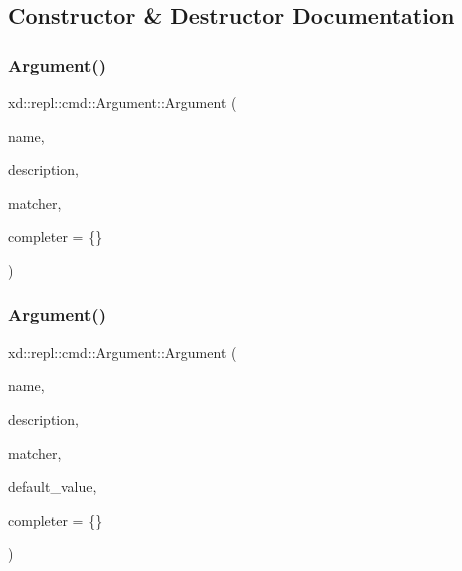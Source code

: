 \subsection{Constructor \& Destructor Documentation}
\mbox{\label{classxd_1_1repl_1_1cmd_1_1_argument_a8260fe4187d130feec98554d0fae8f08}} 
\subsubsection{\texorpdfstring{Argument()}{Argument()}\hspace{0.1cm}{\footnotesize\ttfamily [1/2]}}
{\footnotesize\ttfamily xd\+::repl\+::cmd\+::\+Argument\+::\+Argument (\begin{DoxyParamCaption}\item[{std\+::string}]{name,  }\item[{std\+::string}]{description,  }\item[{\mbox{\hyperlink{classxd_1_1repl_1_1cmd_1_1_argument_a7284341abe139b035abfc7e1dca5d42e}{Matcher\+Fn}}}]{matcher,  }\item[{\mbox{\hyperlink{classxd_1_1repl_1_1cmd_1_1_argument_ae3fcd7357ab584e17d2fb86c1f077fe9}{Completer\+Fn}}}]{completer = {\ttfamily \{\}} }\end{DoxyParamCaption})\hspace{0.3cm}{\ttfamily [inline]}}

\mbox{\label{classxd_1_1repl_1_1cmd_1_1_argument_afad52ea261c337709515b2a85bf435ad}} 
\subsubsection{\texorpdfstring{Argument()}{Argument()}\hspace{0.1cm}{\footnotesize\ttfamily [2/2]}}
{\footnotesize\ttfamily xd\+::repl\+::cmd\+::\+Argument\+::\+Argument (\begin{DoxyParamCaption}\item[{std\+::string}]{name,  }\item[{std\+::string}]{description,  }\item[{\mbox{\hyperlink{classxd_1_1repl_1_1cmd_1_1_argument_a7284341abe139b035abfc7e1dca5d42e}{Matcher\+Fn}}}]{matcher,  }\item[{std\+::string}]{default\+\_\+value,  }\item[{\mbox{\hyperlink{classxd_1_1repl_1_1cmd_1_1_argument_ae3fcd7357ab584e17d2fb86c1f077fe9}{Completer\+Fn}}}]{completer = {\ttfamily \{\}} }\end{DoxyParamCaption})\hspace{0.3cm}{\ttfamily [inline]}}



